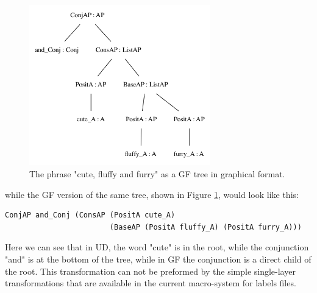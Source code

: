 \documentclass{article}
\begin{document}
\begin{figure}
    \centering
    \includegraphics[width=0.7\textwidth]{cute_gf.png}
    \caption{The phrase "cute, fluffy and furry" as a GF tree in graphical format. }
    \label{fig:gf_cute}
\end{figure}

while the GF version of the same tree, shown in Figure \ref{fig:gf_cute}, would look like this:

\begin{verbatim}
ConjAP and_Conj (ConsAP (PositA cute_A) 
                        (BaseAP (PositA fluffy_A) (PositA furry_A)))
\end{verbatim}
Here we can see that in UD, the word "cute" is in the root, while the conjunction "and" is at the bottom of the tree, while in GF the conjunction is a direct child of the root. This transformation can not be preformed by the simple single-layer transformations that are available in the current macro-system for labels files.

% 
% 
% 


\end{document}
